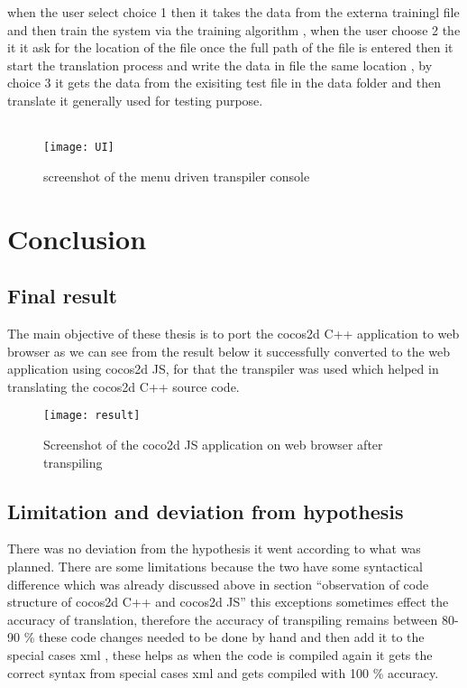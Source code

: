 \documentclass[23pt]{article}
\begin{document}
{\Large when the user select choice 1 then it takes the data from the externa trainingl file and then train the system via the training algorithm , when the user choose 2 the it it ask for the location of the file once the full path of the file is entered then it start the translation process and write the data in file the same location , by choice 3 it gets the data from the exisiting test file in the data folder and then translate it generally used for testing purpose. \\ \\ \par}

\begin{figure}[h]
\caption{screenshot of the menu driven transpiler console}
\centering
\texttt{[image: UI]}
\end{figure}

\newpage

\section{Conclusion}

\subsection{Final result}

{\Large The main objective of these thesis is to port the cocos2d C++ application to web browser as we can see from the result below it successfully converted to the web application using cocos2d JS, for that the transpiler was used which helped in translating the cocos2d C++ source code. \\  \par}


\begin{figure}[h]
\caption{Screenshot of the coco2d JS application on web browser after transpiling}
\centering
\texttt{[image: result]}
\end{figure}

\newpage

\subsection{Limitation and deviation from hypothesis}
{\Large There was no deviation from the hypothesis it went according to what was planned.
             There are some limitations because the two have some syntactical difference which was already discussed above in section “observation of code structure of cocos2d C++  and cocos2d JS” this exceptions sometimes effect the accuracy of translation, therefore  the accuracy of transpiling remains between 80-90 \% these code changes needed to be done by hand and then add it to the special cases xml , these  helps as when the code is compiled  again it gets the correct syntax from special cases xml and  gets compiled with 100 \% accuracy.
\\  \par}
\end{document}
